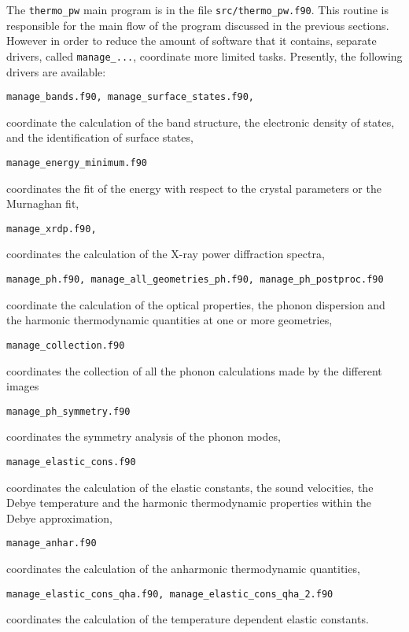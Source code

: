 \documentclass[12pt,a4paper]{article}
\begin{document}
The \texttt{thermo\_pw} main program is in the file \texttt{src/thermo\_pw.f90}.
This routine is responsible for the main flow of the program discussed
in the previous sections. However in order to reduce the amount of
software that it contains, separate drivers, called 
\texttt{manage\_...},  coordinate more limited tasks.
Presently, the following drivers are available:
\begin{verbatim}
manage_bands.f90, manage_surface_states.f90,      
\end{verbatim}
coordinate the calculation of the band structure, the electronic density
of states, and the identification of surface states,
\begin{verbatim}
manage_energy_minimum.f90      
\end{verbatim}
coordinates the fit of the energy with respect to the crystal parameters
or the Murnaghan fit,
\begin{verbatim}
manage_xrdp.f90,                
\end{verbatim}
coordinates the calculation of the X-ray power diffraction spectra,
\begin{verbatim}
manage_ph.f90, manage_all_geometries_ph.f90, manage_ph_postproc.f90      
\end{verbatim}
coordinate the calculation of the optical properties, the phonon dispersion
and the harmonic thermodynamic quantities at one or more geometries,
\begin{verbatim}
manage_collection.f90
\end{verbatim}
coordinates the collection of all the phonon calculations made by the 
different images
\begin{verbatim}
manage_ph_symmetry.f90
\end{verbatim}
coordinates the symmetry analysis of the phonon modes,
\begin{verbatim}
manage_elastic_cons.f90        
\end{verbatim}
coordinates the calculation of the elastic constants, the sound velocities,
the Debye temperature and the harmonic thermodynamic properties within the 
Debye approximation,
\begin{verbatim}
manage_anhar.f90               
\end{verbatim}
coordinates the calculation of the anharmonic thermodynamic quantities,
\begin{verbatim}
manage_elastic_cons_qha.f90, manage_elastic_cons_qha_2.f90        
\end{verbatim}
coordinates the calculation of the temperature dependent elastic constants.
\end{document}
